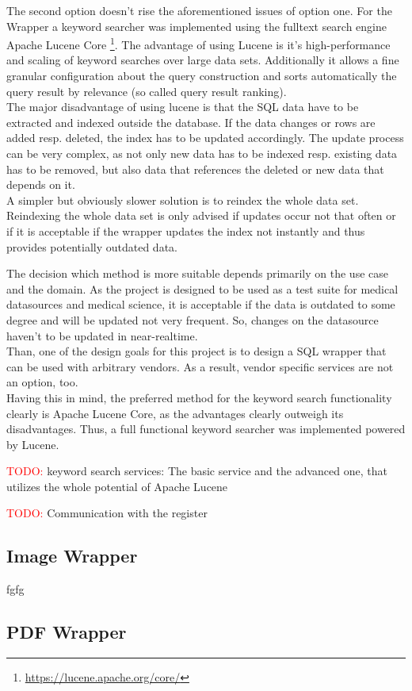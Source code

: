 The second option doesn't rise the aforementioned issues of option one. For the Wrapper a keyword searcher was implemented using the fulltext search engine Apache Lucene Core \footnote{\url{https://lucene.apache.org/core/}}. The advantage of using Lucene is it's high-performance and scaling of keyword searches over large data sets. Additionally it allows a fine granular configuration about the query construction and sorts automatically the query result by relevance (so called query result ranking). \\
The major disadvantage of using lucene is that the SQL data have to be extracted and indexed outside the database. If the data changes or rows are added resp. deleted, the index has to be updated accordingly. The update process can be very complex, as not only new data has to be indexed resp. existing data has to be removed, but also data that references the deleted or new data that depends on it.\\
A simpler but obviously slower solution is to reindex the whole data set. Reindexing the whole data set is only advised if updates occur not that often or if it is acceptable if the wrapper updates the index not instantly and thus provides potentially outdated data.

The decision which method is more suitable depends primarily on the use case and the domain. As the project is designed to be used as a test suite for medical datasources and medical science, it is acceptable if the data is outdated to some degree and will be updated not very frequent. So, changes on the datasource haven't to be updated in near-realtime. \\
Than, one of the design goals for this project is to design a SQL wrapper that can be used with arbitrary vendors. As a result, vendor specific services are not an option, too.\\
Having this in mind, the preferred method for the keyword search functionality clearly is Apache Lucene Core, as the  advantages clearly outweigh its disadvantages. Thus, a full functional keyword searcher was implemented powered by Lucene.


\textcolor{red}{TODO:} keyword search services: The basic service and the advanced one, that utilizes the whole potential of Apache Lucene

\textcolor{red}{TODO:} Communication with the register

\subsection{Image Wrapper}
fgfg
\subsection{PDF Wrapper}